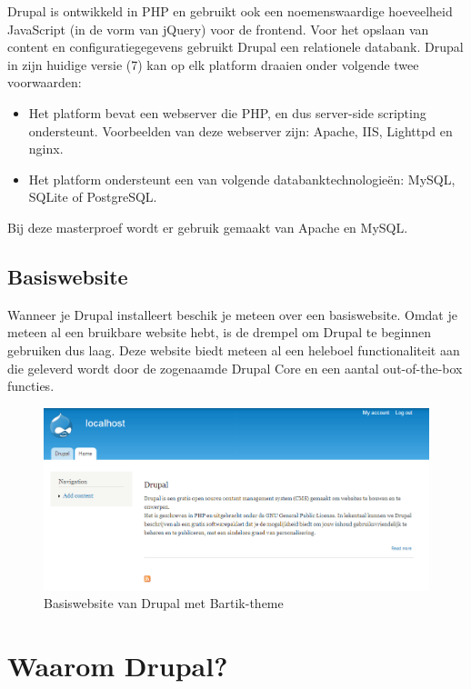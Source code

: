 Drupal is ontwikkeld in PHP en gebruikt ook een noemenswaardige hoeveelheid JavaScript (in de vorm van jQuery) voor de frontend. Voor het opslaan van content en configuratiegegevens gebruikt Drupal een relationele databank. Drupal in zijn huidige versie (7) kan op elk platform draaien onder volgende twee voorwaarden:
\begin{itemize}
\item Het platform bevat een webserver die PHP, en dus server-side scripting ondersteunt. Voorbeelden van deze webserver zijn:  Apache, IIS, Lighttpd en nginx.
\item Het platform ondersteunt een van volgende databanktechnologie\"{e}n: MySQL, SQLite of PostgreSQL.
\end{itemize}
Bij deze masterproef wordt er gebruik gemaakt van Apache en MySQL.

\subsection{Basiswebsite}

Wanneer je Drupal installeert beschik je meteen over een basiswebsite. Omdat je meteen al een bruikbare website hebt, is de drempel om Drupal te beginnen gebruiken dus laag. Deze website biedt meteen al een heleboel functionaliteit aan die geleverd wordt door de zogenaamde Drupal Core en een aantal out-of-the-box functies.
\begin{figure}[h]
\begin{center}
\includegraphics[keepaspectratio,width=1\textwidth]{fig/drupalBasiswebsite}
\vspace{-30pt}
\caption{Basiswebsite van Drupal met Bartik-theme}
\vspace{-30pt}
\end{center}
\end{figure}

\section{Waarom Drupal?}

